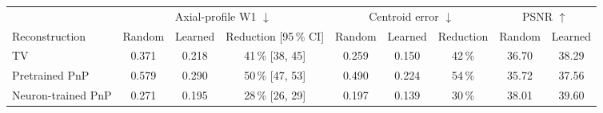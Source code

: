 \begin{tabular}{@{}l ccc ccc cc@{}}
\toprule
 & \multicolumn{3}{c}{Axial-profile W1 $\downarrow$} & \multicolumn{3}{c}{Centroid error $\downarrow$} & \multicolumn{2}{c}{PSNR $\uparrow$}\\
\cmidrule(lr){2-4}\cmidrule(lr){5-7}\cmidrule(l){8-9}
Reconstruction & Random & Learned & Reduction [95\,\% CI] & Random & Learned & Reduction & Random & Learned\\
\midrule
TV & 0.371 & 0.218 & 41\,\% [38, 45] & 0.259 & 0.150 & 42\,\% & 36.70 & 38.29\\
Pretrained PnP & 0.579 & 0.290 & 50\,\% [47, 53] & 0.490 & 0.224 & 54\,\% & 35.72 & 37.56\\
Neuron-trained PnP & 0.271 & 0.195 & 28\,\% [26, 29] & 0.197 & 0.139 & 30\,\% & 38.01 & 39.60\\
\bottomrule
\end{tabular}
